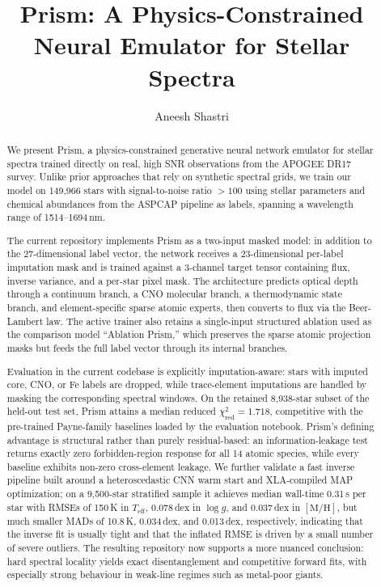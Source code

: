 \documentclass[preprint]{aastex701-1/aastex701}
\begin{document}
\title{Prism: A Physics-Constrained Neural Emulator for Stellar Spectra}

\author[0009-0006-8079-688X]{Aneesh Shastri}

\begin{abstract}
We present Prism, a physics-constrained generative neural network emulator for stellar spectra
trained directly on real, high SNR observations from the APOGEE DR17 survey.
Unlike prior approaches that rely on synthetic spectral grids, we train our model on
149,966 stars with signal-to-noise ratio $>100$ using stellar parameters and chemical
abundances from the ASPCAP pipeline as labels, spanning a wavelength range of 1514--1694\,nm.

The current repository implements Prism as a two-input masked model: in addition to the
27-dimensional label vector, the network receives a 23-dimensional per-label imputation
mask and is trained against a 3-channel target tensor containing flux, inverse variance,
and a per-star pixel mask. The architecture predicts optical depth through a continuum
branch, a CNO molecular branch, a thermodynamic state branch, and element-specific sparse
atomic experts, then converts to flux via the Beer-Lambert law. The active trainer also
retains a single-input structured ablation used as the comparison model ``Ablation Prism,''
which preserves the sparse atomic projection masks but feeds the full label vector through
its internal branches.

Evaluation in the current codebase is explicitly imputation-aware: stars with imputed core,
CNO, or Fe labels are dropped, while trace-element imputations are handled by masking the
corresponding spectral windows. On the retained 8,938-star subset of the held-out test set,
Prism attains a median reduced $\chi^2_\mathrm{red}=1.718$, competitive with the
pre-trained Payne-family baselines loaded by the evaluation notebook. Prism's defining
advantage is structural rather than purely residual-based: an information-leakage test
returns exactly zero forbidden-region response for all 14 atomic species, while every
baseline exhibits non-zero cross-element leakage. We further validate a fast inverse
pipeline built around a heteroscedastic CNN warm start and XLA-compiled MAP optimization;
on a 9,500-star stratified sample it achieves median wall-time 0.31\,s per star with
RMSEs of 150\,K in $T_\mathrm{eff}$, 0.078\,dex in $\log g$, and 0.037\,dex in
$[\mathrm{M/H}]$, but much smaller MADs of 10.8\,K, 0.034\,dex, and 0.013\,dex,
respectively, indicating that the inverse fit is usually tight and that the inflated RMSE
is driven by a small number of severe outliers. The resulting repository now supports a
more nuanced conclusion: hard spectral locality yields exact disentanglement and
competitive forward fits, with especially strong behaviour in weak-line regimes such as
metal-poor giants.
\end{abstract}
\end{document}
